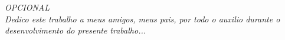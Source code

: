 \begin{dedicatoria}
   \vspace*{\fill}
   \centering
   \noindent
   \textit{ 
   OPCIONAL\\ Dedico este trabalho a meus amigos, meus pais, por todo o auxilio durante o desenvolvimento do presente trabalho...} 
   \vspace*{\fill}
\end{dedicatoria}
